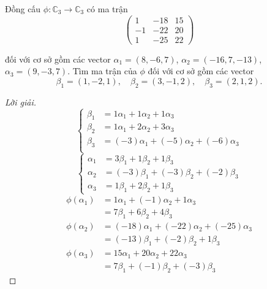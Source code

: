 \documentclass[class=linearalgebra,crop=false]{standalone}
\begin{document}
\begin{exercise}
    Đồng cấu $\phi: \mathbb{C}_{3}\to\mathbb{C}_{3}$ có ma trận
    \[
        \begin{pmatrix}
            1  & -18 & 15 \\
            -1 & -22 & 20 \\
            1  & -25 & 22
        \end{pmatrix}
    \]
    \par đối với cơ sở gồm các vector $\alpha_{1} = (8, -6, 7)$, $\alpha_{2} = (-16, 7, -13)$, $\alpha_{3} = (9, -3, 7)$. Tìm ma trận của $\phi$ đối với cơ sở gồm các vector
    \[
        \beta_{1} = (1, -2, 1),\quad\beta_{2} = (3, -1, 2),\quad\beta_{3} = (2, 1, 2).
    \]
\end{exercise}

\begin{proof}[Lời giải]
    \[
        \begin{cases}
            \beta_{1} & = 1\alpha_{1} + 1\alpha_{2} + 1\alpha_{3}          \\
            \beta_{2} & = 1\alpha_{1} + 2\alpha_{2} + 3\alpha_{3}          \\
            \beta_{3} & = (-3)\alpha_{1} + (-5)\alpha_{2} + (-6)\alpha_{3} \\
        \end{cases}
    \]
    \[
        \begin{cases}
            \alpha_{1} & = 3\beta_{1} + 1\beta_{2} + 1\beta_{3}          \\
            \alpha_{2} & = (-3)\beta_{1} + (-3)\beta_{2} + (-2)\beta_{3} \\
            \alpha_{3} & = 1\beta_{1} + 2\beta_{2} + 1\beta_{3}
        \end{cases}
    \]
    \begin{align*}
        \phi(\alpha_{1}) & = 1\alpha_{1} + (-1)\alpha_{2} + 1\alpha_{3}          \\
                         & = 7\beta_{1} + 6\beta_{2} + 4\beta_{3}                \\
        \phi(\alpha_{2}) & = (-18)\alpha_{1} + (-22)\alpha_{2} + (-25)\alpha_{3} \\
                         & = (-13)\beta_{1} + (-2)\beta_{2} + 1\beta_{3}         \\
        \phi(\alpha_{3}) & = 15\alpha_{1} + 20\alpha_{2} + 22\alpha_{3}          \\
                         & = 7\beta_{1} + (-1)\beta_{2} + (-3)\beta_{3}
    \end{align*}

\end{proof}
\end{document}
